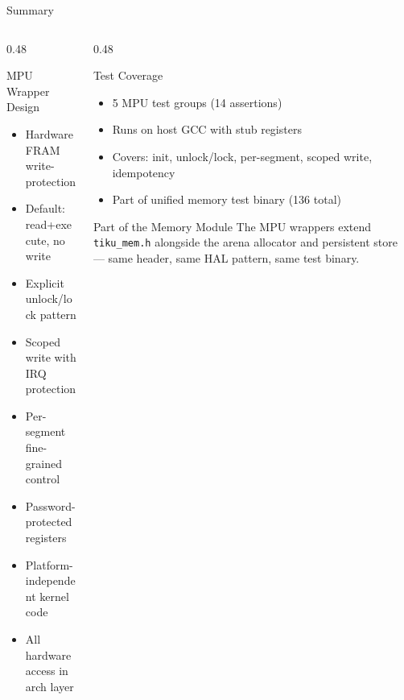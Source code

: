\documentclass[aspectratio=169, 10pt]{beamer}
\begin{document}
\begin{frame}{Summary}
\begin{columns}[T]
\begin{column}{0.48\textwidth}
\begin{block}{MPU Wrapper Design}
\begin{itemize}
  \item Hardware FRAM write-protection
  \item Default: read+execute, no write
  \item Explicit unlock/lock pattern
  \item Scoped write with IRQ protection
  \item Per-segment fine-grained control
  \item Password-protected registers
  \item Platform-independent kernel code
  \item All hardware access in arch layer
\end{itemize}
\end{block}
\end{column}

\begin{column}{0.48\textwidth}
\begin{block}{Test Coverage}
\begin{itemize}
  \item 5 MPU test groups (14 assertions)
  \item Runs on host GCC with stub registers
  \item Covers: init, unlock/lock, per-segment,
        scoped write, idempotency
  \item Part of unified memory test binary (136 total)
\end{itemize}
\end{block}

\vspace{0.3em}
\begin{alertblock}{Part of the Memory Module}
The MPU wrappers extend \texttt{tiku\_mem.h} alongside the arena
allocator and persistent store --- same header, same HAL pattern,
same test binary.
\end{alertblock}
\end{column}
\end{columns}
\end{frame}
\end{document}

